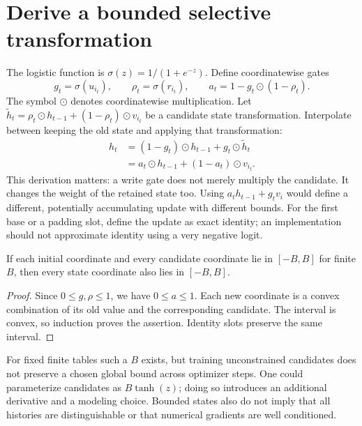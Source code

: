 \section{Derive a bounded selective transformation}
The logistic function is $\sigma(z)=1/(1+e^{-z})$. Define coordinatewise gates
\begin{equation}
 g_t=\sigma(u_{i_t}),\qquad \rho_t=\sigma(r_{i_t}),
 \qquad a_t=1-g_t\odot(1-\rho_t).
 \label{eq:coefficients}
\end{equation}
The symbol $\odot$ denotes coordinatewise multiplication. Let
$\widetilde h_t=\rho_t\odot h_{t-1}+(1-\rho_t)\odot v_{i_t}$ be a
candidate state transformation. Interpolate between keeping the old state
and applying that transformation:
\begin{align}
 h_t&=(1-g_t)\odot h_{t-1}+g_t\odot\widetilde h_t\\
    &=a_t\odot h_{t-1}+(1-a_t)\odot v_{i_t}.
 \label{eq:update}
\end{align}
This derivation matters: a write gate does not merely multiply the candidate.
It changes the weight of the retained state too. Using $a_t h_{t-1}+g_tv_i$
would define a different, potentially accumulating update with different bounds.
For the first base or a padding slot, define the update as exact identity;
an implementation should not approximate identity using a very negative logit.


\begin{proposition}
If each initial coordinate and every candidate coordinate lie in $[-B,B]$
for finite $B$, then every state coordinate also lies in $[-B,B]$.
\end{proposition}
\begin{proof}
Since $0\leq g,\rho\leq1$, we have $0\leq a\leq1$. Each new coordinate
is a convex combination of its old value and the corresponding candidate.
The interval is convex, so induction proves the assertion. Identity slots
preserve the same interval.
\end{proof}
For fixed finite tables such a $B$ exists, but training unconstrained candidates
does not preserve a chosen global bound across optimizer steps. One could
parameterize candidates as $B\tanh(z)$; doing so introduces an additional
derivative and a modeling choice. Bounded states also do not imply that all
histories are distinguishable or that numerical gradients are well conditioned.

